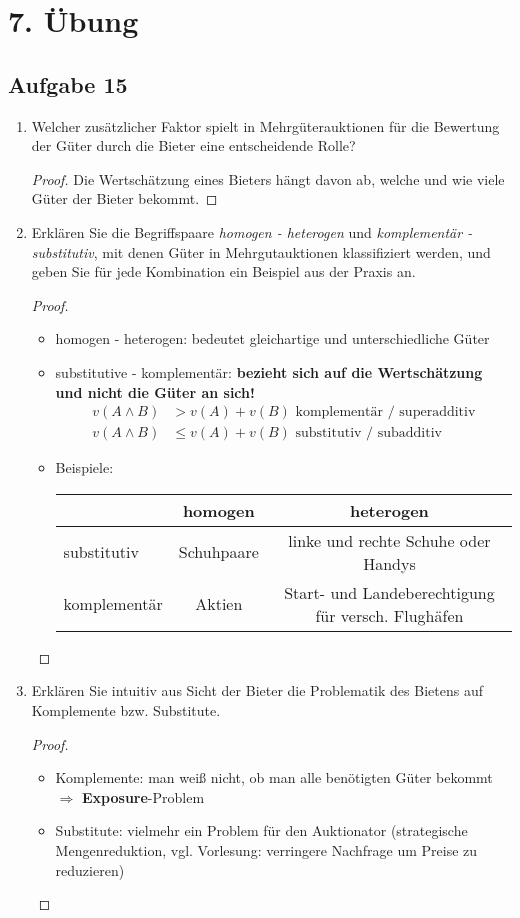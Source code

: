 \documentclass[12pt]{extreport} %
\theoremstyle{named}
\theoremstyle{itshape}
\theoremstyle{normal}
\begin{document}
\section*{7. Übung}

\subsection*{Aufgabe 15}

\begin{enumerate}
	\item Welcher zusätzlicher Faktor spielt in Mehrgüterauktionen für die Bewertung der Güter durch die Bieter eine entscheidende Rolle?
		\begin{proof}
			Die Wertschätzung eines Bieters hängt davon ab, welche und wie viele Güter der Bieter bekommt.
		\end{proof}
	\item Erklären Sie die Begriffspaare \textit{homogen - heterogen} und \textit{komplementär - substitutiv}, mit denen Güter in Mehrgutauktionen klassifiziert werden, und geben Sie für jede Kombination ein Beispiel aus der Praxis an.
		\begin{proof} ~\
			\begin{itemize}
				\item homogen - heterogen: bedeutet gleichartige und unterschiedliche Güter
				\item substitutive - komplementär: \textbf{bezieht sich auf die Wertschätzung und nicht die Güter an sich!}
					\begin{align*}
						v(A \wedge B ) & > v(A) + v(B) \text{ komplementär / superadditiv} \\
						v(A \wedge B ) & \leq v(A) + v(B) \text{ substitutiv / subadditiv}
					\end{align*}
				\item Beispiele: ~\\
					\begin{tabular}{l|cc}
  						     & homogen    & heterogen \\
  								\hline
 				substitutiv  & Schuhpaare & linke und rechte Schuhe oder Handys \\
 				komplementär &   Aktien         & Start- und Landeberechtigung für versch. Flughäfen
			\end{tabular}

			\end{itemize}
		\end{proof}
	\item Erklären Sie intuitiv aus Sicht der Bieter die Problematik des Bietens auf Komplemente bzw. Substitute.
		\begin{proof} ~\
			\begin{itemize}
				\item Komplemente: man weiß nicht, ob man alle benötigten Güter bekommt $\Rightarrow$ \textbf{Exposure}-Problem
				\item Substitute: vielmehr ein Problem für den Auktionator (strategische Mengenreduktion, vgl. Vorlesung: verringere Nachfrage um Preise zu reduzieren)
			\end{itemize}
		\end{proof}
\end{enumerate}
\end{document}
